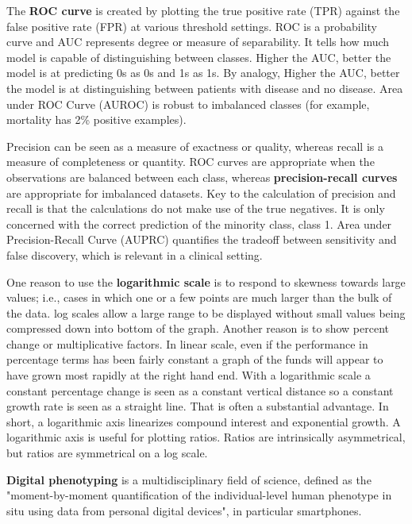 \documentclass[11pt]{article}
\begin{document}
\par The \textbf{ROC curve} is created by plotting the true positive rate (TPR) against the false positive rate (FPR) at various threshold settings. ROC is a probability curve and AUC represents degree or measure of separability. It tells how much model is capable of distinguishing between classes. Higher the AUC, better the model is at predicting 0s as 0s and 1s as 1s. By analogy, Higher the AUC, better the model is at distinguishing between patients with disease and no disease. Area under ROC Curve (AUROC) is robust to imbalanced classes (for example, mortality has 2\% positive examples).
\par Precision can be seen as a measure of exactness or quality, whereas recall is a measure of completeness or quantity. ROC curves are appropriate when the observations are balanced between each class, whereas \textbf{precision-recall curves} are appropriate for imbalanced datasets. Key to the calculation of precision and recall is that the calculations do not make use of the true negatives. It is only concerned with the correct prediction of the minority class, class 1. Area under Precision-Recall Curve (AUPRC) quantifies the tradeoff between sensitivity and false discovery, which is relevant in a clinical setting.
\par One reason to use the \textbf{logarithmic scale} is to respond to skewness towards large values; i.e., cases in which one or a few points are much larger than the bulk of the data. log scales allow a large range to be displayed without small values being compressed down into bottom of the graph. Another reason is to show percent change or multiplicative factors. In linear scale, even if the performance in percentage terms has been fairly constant a graph of the funds will appear to have grown most rapidly at the right hand end. With a logarithmic scale a constant percentage change is seen as a constant vertical distance so a constant growth rate is seen as a straight line. That is often a substantial advantage. In short, a logarithmic axis linearizes compound interest and exponential growth. A logarithmic axis is useful for plotting ratios. Ratios are intrinsically asymmetrical, but ratios are symmetrical on a log scale.
\par \textbf{Digital phenotyping} is a multidisciplinary field of science, defined as the "moment-by-moment quantification of the individual-level human phenotype in situ using data from personal digital devices", in particular smartphones.
\end{document}
